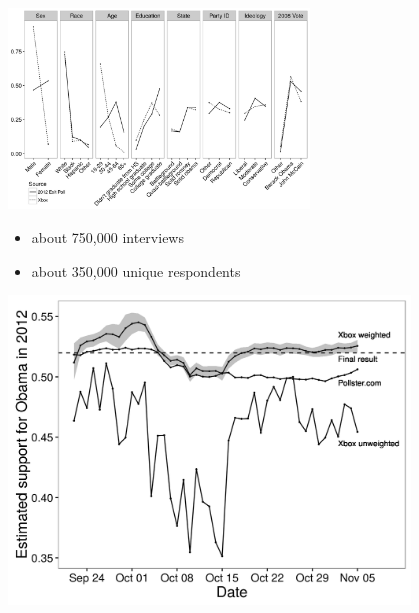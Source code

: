 \documentclass[aspectratio=169]{beamer}
\begin{document}
\begin{frame}

\begin{center}
\includegraphics[width=0.6\textwidth]{figures/bitbybit3-7_wang_forecasting_2015_fig1}
\end{center}

\begin{itemize}
\item about 750,000 interviews
\item about 350,000 unique respondents
\end{itemize}

\end{frame}
\begin{frame}

\begin{center}
\includegraphics[width=0.8\textwidth]{figures/bitbybit3-8_wang_forecasting_2015_fig2_and_3}
\end{center}

\end{frame}
\end{document}
